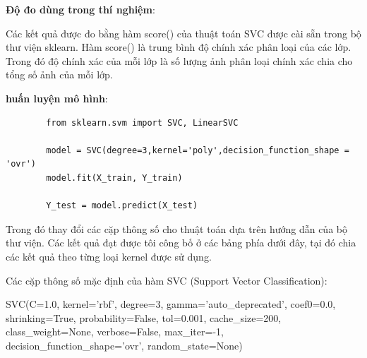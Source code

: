 \documentclass[12pt]{report}
\begin{document}
		\textbf{Độ đo dùng trong thí nghiệm}: 
		
		Các kết quả được đo bằng hàm score() của thuật toán SVC được cài sẵn trong bộ thư viện 
		sklearn. Hàm score() là trung bình độ chính xác phân loại của các lớp. Trong đó 
		độ chính xác của mỗi lớp là số lượng ảnh phân loại chính xác chia cho tổng số ảnh của mỗi lớp.

		\textbf{huấn luyện mô hình}:

		\begin{lstlisting}
		from sklearn.svm import SVC, LinearSVC

		model = SVC(degree=3,kernel='poly',decision_function_shape = 'ovr')
		model.fit(X_train, Y_train)

		Y_test = model.predict(X_test)
		\end{lstlisting}
				
		Trong đó thay đổi các cặp thông số cho thuật toán dựa trên hướng dẫn của bộ thư viện. Các kết quả đạt được tôi công bố ở các bảng phía dưới đây, tại đó chia các kết quả theo từng loại kernel được sử dụng.
						
		Các cặp thông số mặc định của hàm SVC (Support Vector Classification): 
				
		SVC(C=1.0, kernel='rbf', degree=3, gamma='auto\_deprecated', coef0=0.0, shrinking=True, probability=False, tol=0.001, cache\_size=200, class\_weight=None, verbose=False, max\_iter=-1, decision\_function\_shape=’ovr’, random\_state=None)
\end{document}
